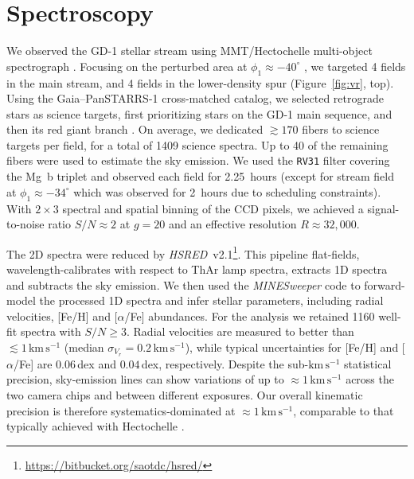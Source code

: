 \documentclass[twocolumn]{aastex63}
\newcommand{\package}[1]{\textsl{#1}}
\newcommand{\kms}{\ensuremath{\textrm{km}\,\textrm{s}^{-1}}}
\begin{document}
\section{Spectroscopy}
\label{sec:spec}

We observed the GD-1 stellar stream using MMT/Hectochelle multi-object spectrograph \citep{szentgyorgyi2011}.
Focusing on the perturbed area at $\phi_1\approx-40^\circ$ \citep[$\phi_{1,2}$ are coordinates oriented along and perpendicular to GD-1, respectively;][]{koposov2010}, we targeted 4 fields in the main stream, and 4 fields in the lower-density spur (Figure~\ref{fig:vr}, top).
Using the Gaia--PanSTARRS-1 cross-matched catalog, we selected retrograde stars as science targets, first prioritizing stars on the GD-1 main sequence, and then its red giant branch \citep[see][]{pwb}.
On average, we dedicated $\gtrsim170$ fibers to science targets per field, for a total of 1409 science spectra.
Up to 40 of the remaining fibers were used to estimate the sky emission.
We used the \texttt{RV31} filter covering the Mg~b triplet and observed each field for 2.25~hours (except for stream field at $\phi_1\approx-34^\circ$ which was observed for 2~hours due to scheduling constraints).
With $2\times3$ spectral and spatial binning of the CCD pixels, we achieved a signal-to-noise ratio $S/N\approx2$ at $g=20$ and an effective resolution $R\approx32,000$.

The 2D spectra were reduced by \package{HSRED}~v2.1\footnote{\url{https://bitbucket.org/saotdc/hsred/}}.
This pipeline flat-fields, wavelength-calibrates with respect to ThAr lamp spectra, extracts 1D spectra and subtracts the sky emission.
We then used the \package{MINESweeper} code \citep{cargile2019} to forward-model the processed 1D spectra and infer stellar parameters, including radial velocities, [Fe/H] and [$\alpha$/Fe] abundances.
For the analysis we retained 1160 well-fit spectra with $S/N\geq3$.
Radial velocities are measured to better than $\lesssim1\,\kms$ (median $\sigma_{V_r}=0.2\,\kms$), while typical uncertainties for [Fe/H] and [$\alpha$/Fe] are $0.06$\,dex and $0.04$\,dex, respectively.
Despite the sub-$\kms$ statistical precision, sky-emission lines can show variations of up to $\approx1\,\kms$ across the two camera chips and between different exposures.
Our overall kinematic precision is therefore systematics-dominated at $\approx1\,\kms$, comparable to that typically achieved with Hectochelle \citep[e.g.,][]{caldwell2017}.
\end{document}
